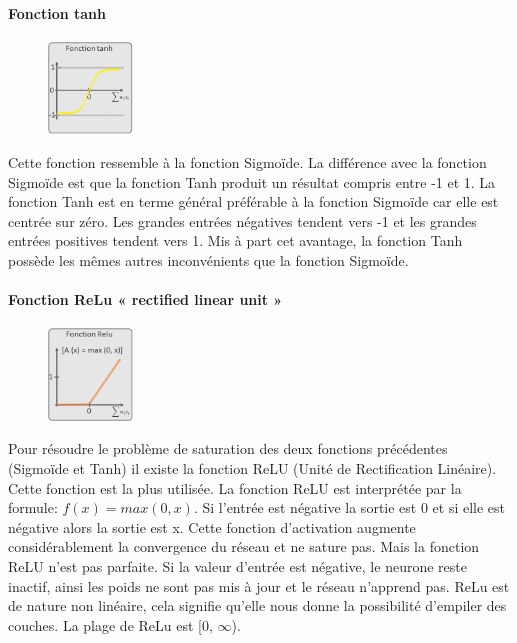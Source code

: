 \paragraph*{Fonction tanh}
\begin{figure}
    \vspace{-1 cm}
    \includegraphics[width=0.2\textwidth]{img/tanhfunc.png}
    \vspace{-1 cm}
\end{figure}
Cette fonction ressemble à la fonction Sigmoïde. La différence avec la fonction Sigmoïde est que la fonction Tanh produit un résultat compris entre -1 et 1. La fonction Tanh est en terme général préférable à la fonction Sigmoïde car elle est centrée sur zéro. Les grandes entrées négatives tendent vers -1 et les grandes entrées positives tendent vers 1. Mis à part cet avantage, la fonction Tanh possède les mêmes autres inconvénients que la fonction Sigmoïde.

\paragraph*{Fonction ReLu « rectified linear unit »}
\begin{figure}
    \vspace{-1 cm}
    \includegraphics[width=0.2\textwidth]{img/relufunc.png}
\end{figure}
Pour résoudre le problème de saturation des deux fonctions précédentes (Sigmoïde et Tanh) il existe la fonction ReLU (Unité de Rectification Linéaire). Cette fonction est la plus utilisée. La fonction ReLU est interprétée par la formule: $f(x) = max(0, x)$. Si l'entrée est négative la sortie est 0 et si elle est négative alors la sortie est x. Cette fonction d'activation augmente considérablement la convergence du réseau et ne sature pas.
Mais la fonction ReLU n'est pas parfaite. Si la valeur d'entrée est négative, le neurone reste inactif, ainsi les poids ne sont pas mis à jour et le réseau n’apprend pas. ReLu est de nature non linéaire, cela signifie qu'elle nous donne la possibilité d'empiler des couches. La plage de ReLu est [0, $\infty$).


